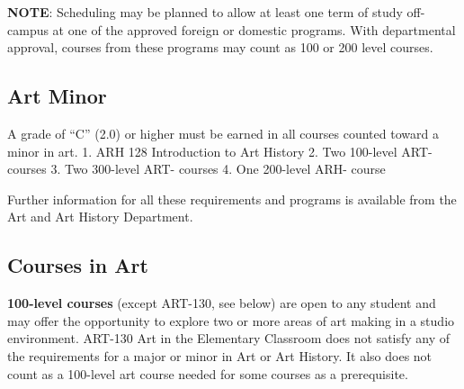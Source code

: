 \documentclass[
  letterpaper,
]{scrbook}
\begin{document}
\textbf{NOTE}: Scheduling may be planned to allow at least one term of
study off-campus at one of the approved foreign or domestic programs.
With departmental approval, courses from these programs may count as 100
or 200 level courses.

\hypertarget{art-minor}{%
\subsection{Art Minor}\label{art-minor}}

A grade of ``C'' (2.0) or higher must be earned in all courses counted
toward a minor in art. 1. ARH 128 Introduction to Art History 2. Two
100-level ART- courses 3. Two 300-level ART- courses 4. One 200-level
ARH- course

Further information for all these requirements and programs is available
from the Art and Art History Department.

\hypertarget{courses-in-art}{%
\subsection{Courses in Art}\label{courses-in-art}}

\textbf{100-level courses} (except ART-130, see below) are open to any
student and may offer the opportunity to explore two or more areas of
art making in a studio environment. ART-130 Art in the Elementary
Classroom does not satisfy any of the requirements for a major or minor
in Art or Art History. It also does not count as a 100-level art course
needed for some courses as a prerequisite.
\end{document}
